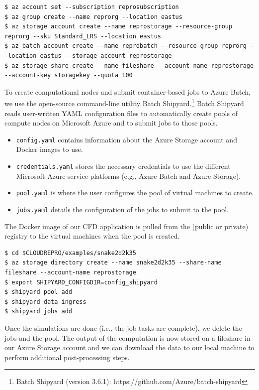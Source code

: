 \documentclass[10pt,journal,compsoc]{IEEEtran}
\begin{document}
\begin{lstlisting}
$ az account set --subscription reprosubscription
$ az group create --name reprorg --location eastus
$ az storage account create --name reprostorage --resource-group reprorg --sku Standard_LRS --location eastus
$ az batch account create --name reprobatch --resource-group reprorg --location eastus --storage-account reprostorage
$ az storage share create --name fileshare --account-name reprostorage --account-key storagekey --quota 100
\end{lstlisting}

To create computational nodes and submit container-based jobs to Azure Batch, we use the open-source command-line utility Batch Shipyard.\footnote{Batch Shipyard (version 3.6.1): https://github.com/Azure/batch-shipyard} Batch Shipyard reads user-written YAML configuration files to automatically create pools of compute nodes on Microsoft Azure and to submit jobs to those pools.

\begin{itemize}
    \item \texttt{config.yaml} contains information about the Azure Storage account and Docker images to use.
    \item \texttt{credentials.yaml} stores the necessary credentials to use the different Microsoft Azure service platforms (e.g., Azure Batch and Azure Storage).
    \item \texttt{pool.yaml} is where the user configures the pool of virtual machines to create.
    \item \texttt{jobs.yaml} details the configuration of the jobs to submit to the pool.
\end{itemize}

The Docker image of our CFD application is pulled from the (public or private) registry to the virtual machines when the pool is created.

\begin{lstlisting}
$ cd $CLOUDREPRO/examples/snake2d2k35
$ az storage directory create --name snake2d2k35 --share-name fileshare --account-name reprostorage
$ export SHIPYARD_CONFIGDIR=config_shipyard
$ shipyard pool add
$ shipyard data ingress
$ shipyard jobs add
\end{lstlisting}

Once the simulations are done (i.e., the job tasks are complete), we delete the jobs and the pool.
The output of the computation is now stored on a fileshare in our Azure Storage account and we can download the data to our local machine to perform additional post-processing steps.
\end{document}
